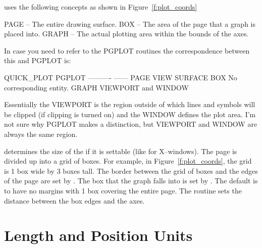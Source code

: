 \quickplot uses the following concepts as shown in Figure~\ref{f:plot_coords}
\begin{example}
  PAGE  -- The entire drawing surface.
  BOX   -- The area of the page that a graph is placed into.
  GRAPH -- The actual plotting area within the bounds of the axes.
\end{example}
In case you need to refer to the PGPLOT routines the correspondence
between this and PGPLOT is:
\begin{example}
  QUICK_PLOT    PGPLOT
  ----------    ------
  PAGE          VIEW SURFACE
  BOX           No corresponding entity.
  GRAPH         VIEWPORT and WINDOW
\end{example}
Essentially the VIEWPORT is the region outside of which lines and symbols
will be clipped (if clipping is turned on) and the WINDOW defines the
plot area. I'm not sure why PGPLOT makes a distinction, but VIEWPORT and
WINDOW are always the same region.

 determines the size of the  if it is
settable (like for X--windows). The page is divided up into a grid of
boxes. For example, in Figure~\ref{f:plot_coords}, the grid is 1 box
wide by 3 boxes tall. The border between the grid of boxes and the
edges of the page are set by .  The box that
the graph falls into is set by . The default is to have
no margins with 1 box covering the entire page. The 
routine sets the distance between the box edges and the axes.


\section{Length and Position Units}
\label{s:plot_units}

